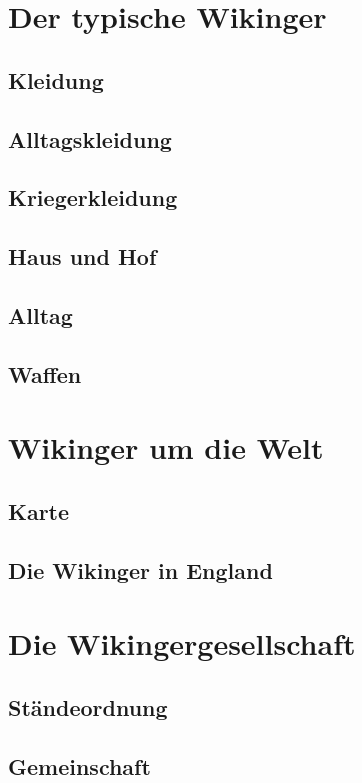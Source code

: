 \documentclass[12pt,a4paper,ngerman,openany]{book}
\newcommand{\fchapter}[1]{\chapter{#1}\thispagestyle{chapterstyle}}
\begin{document}
\fchapter{Der typische Wikinger}

\section{Kleidung}
\section{Alltagskleidung}

\section{Kriegerkleidung}

\section{Haus und Hof} %

\section{Alltag} %

\lipsum[6]

\section{Waffen}

\lipsum[1-2]

\fchapter{Wikinger um die Welt}

\section{Karte} %

\section{Die Wikinger in England}

\lipsum[3]

\fchapter{Die Wikingergesellschaft}

\section{Ständeordnung}

\lipsum[6]

\section{Gemeinschaft}
\end{document}
